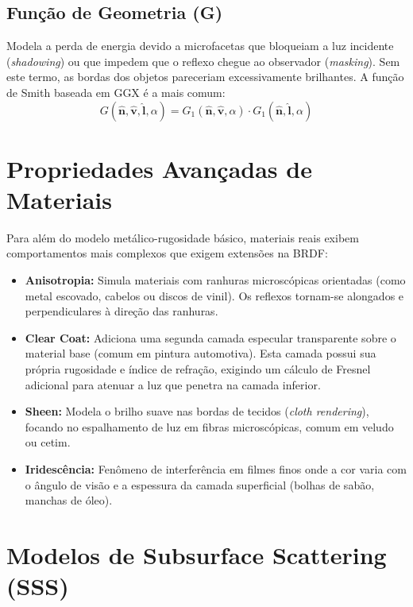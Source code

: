 \subsection{Função de Geometria (G)}
Modela a perda de energia devido a microfacetas que bloqueiam a luz incidente (\textit{shadowing}) ou que impedem que o reflexo chegue ao observador (\textit{masking}). Sem este termo, as bordas dos objetos pareceriam excessivamente brilhantes. A função de Smith baseada em GGX é a mais comum:
\begin{equation}
    G(\hat{\mathbf{n}}, \hat{\mathbf{v}}, \hat{\mathbf{l}}, \alpha) = G_1(\hat{\mathbf{n}}, \hat{\mathbf{v}}, \alpha) \cdot G_1(\hat{\mathbf{n}}, \hat{\mathbf{l}}, \alpha)
\end{equation}

\section{Propriedades Avançadas de Materiais}

Para além do modelo metálico-rugosidade básico, materiais reais exibem comportamentos mais complexos que exigem extensões na BRDF:

\begin{itemize}
    \item \textbf{Anisotropia:} Simula materiais com ranhuras microscópicas orientadas (como metal escovado, cabelos ou discos de vinil). Os reflexos tornam-se alongados e perpendiculares à direção das ranhuras.
    \item \textbf{Clear Coat:} Adiciona uma segunda camada especular transparente sobre o material base (comum em pintura automotiva). Esta camada possui sua própria rugosidade e índice de refração, exigindo um cálculo de Fresnel adicional para atenuar a luz que penetra na camada inferior.
    \item \textbf{Sheen:} Modela o brilho suave nas bordas de tecidos (\textit{cloth rendering}), focando no espalhamento de luz em fibras microscópicas, comum em veludo ou cetim.
    \item \textbf{Iridescência:} Fenômeno de interferência em filmes finos onde a cor varia com o ângulo de visão e a espessura da camada superficial (bolhas de sabão, manchas de óleo).
\end{itemize}

\section{Modelos de Subsurface Scattering (SSS)}

